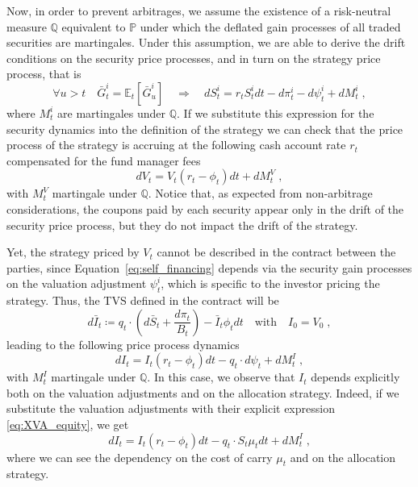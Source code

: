 \documentclass[runningheads]{m2ef}
\begin{document}
	Now, in order to prevent arbitrages, we assume the existence of a risk-neutral measure $\mathbb{Q}$ equivalent to $\mathbb{P}$ under which the deflated gain processes of all traded securities are martingales. Under this assumption, we are able to derive the drift conditions on the security price processes, and in turn on the strategy price process, that is
	\begin{equation}
		\forall u >t \quad \bar{G}_t^i = \mathbb{E}_t \left[\bar{G}_u^i\right] \quad\Longrightarrow \quad dS_t^i = r_tS_t^idt-d\pi_t^i-d\psi_t^i + dM_t^i \; ,
	\label{eq:risk_neutral}\end{equation}
	where $M_t^i$ are martingales under $\mathbb{Q}$. If we substitute this expression for the security dynamics into the definition of the strategy we can check that the price process of the strategy is accruing at the following cash account rate $r_t$ compensated for the fund manager fees
	\begin{equation}
		dV_t = V_t(r_t-\phi_t)dt + dM_t^V \; ,
	\end{equation}
	with $M_t^V$ martingale under $\mathbb{Q}$. Notice that, as expected from non-arbitrage considerations, the coupons paid by each security appear only in the drift of the security price process, but they do not impact the drift of the strategy. 

	Yet, the strategy priced by $V_t$ cannot be described in the contract between the parties, since Equation~\eqref{eq:self_financing} depends via the security gain processes on the valuation adjustment $\psi_t^i$, which is specific to the investor pricing the strategy. Thus, the TVS defined in the contract will be
	\begin{equation}
		d\bar{I}_t \coloneqq q_t \cdot \left(d\bar{S}_t + \frac{d\pi_t}{B_t} \right) - \bar{I}_t\phi_t dt \quad \text{with} \quad I_0 = V_0 \; , 
	\label{eq:TVS_first}\end{equation}
	leading to the following price process dynamics
	\begin{equation}
		dI_t = I_t(r_t-\phi_t)dt -q_t\cdot d\psi_t +dM_t^I \; ,
	\end{equation}
	with $M_t^I$ martingale under $\mathbb{Q}$. In this case, we observe that $I_t$ depends explicitly both on the valuation adjustments and on the allocation strategy. Indeed, if we substitute the valuation adjustments with their explicit expression \eqref{eq:XVA_equity}, we get
	\begin{equation}
		dI_t = I_t(r_t-\phi_t)dt - q_t \cdot S_t \mu_t dt + dM_t^I \; ,
	\end{equation}
	where we can see the dependency on the cost of carry $\mu_t$ and on the allocation strategy.
\end{document}
